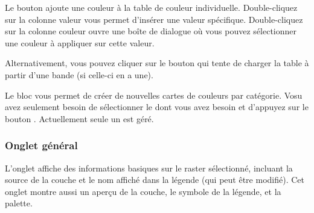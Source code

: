 Le bouton  ajoute une couleur à la table de couleur
individuelle. Double-cliquez sur la colonne valeur vous permet d'insérer une
valeur spécifique. Double-cliquez sur la colonne couleur ouvre une boîte de
dialogue   où vous pouvez sélectionner une
couleur à appliquer sur cette valeur.

Alternativement, vous pouvez cliquer sur le bouton
  qui tente de charger la table à partir d'une bande (si celle-ci en a
une).

Le bloc  vous permet de
créer de nouvelles cartes de couleurs par catégorie. Vosu avez seulement besoin
de sélectionner le  dont vous avez besoin
et d'appuyez sur le bouton . Actuellement seule un 
 est géré.

\subsubsection{Onglet général}\label{label_generaltab}

L'onglet  affiche des informations basiques sur le raster
sélectionné, incluant la source de la couche et le nom affiché dans la légende
(qui peut être modifié). Cet onglet montre aussi un aperçu de la couche, le
symbole de la légende, et la palette.

